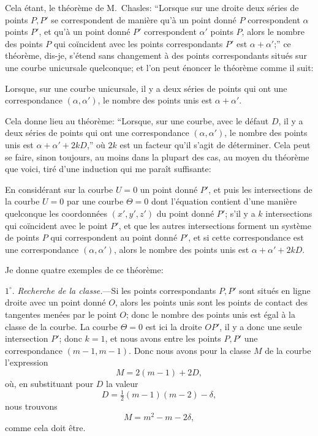 \documentclass[11pt]{article}
\begin{document}
Cela \'etant, le th\'eor\`eme de M.~Chasles: ``Lorsque sur une droite deux s\'eries de points $P, P'$ se correspondent de mani\`ere qu'\`a un point donn\'e $P$ correspondent $\alpha$ points $P'$, et qu'\`a un point donn\'e $P'$ correspondent $\alpha'$ points $P$, alors le nombre des points $P$ qui co\"incident avec les points correspondants $P'$ est $\alpha + \alpha'$;'' ce th\'eor\`eme, dis-je, s'\'etend sans changement \`a des points correspondants situ\'es sur une courbe unicursale quelconque; et l'on peut \'enoncer le th\'eor\`eme comme il suit:

Lorsque, sur une courbe unicursale, il y a deux s\'eries de points qui ont une correspondance $(\alpha, \alpha')$, le nombre des points unis est $\alpha + \alpha'$.

Cela donne lieu au th\'eor\`eme: ``Lorsque, sur une courbe, avec le d\'efaut $D$, il y a deux s\'eries de points qui ont une correspondance $(\alpha, \alpha')$, le nombre des points unis est $\alpha + \alpha' + 2kD$,'' o\`u $2k$ est un facteur qu'il s'agit de d\'eterminer. Cela peut se faire, sinon toujours, au moins dans la plupart des cas, au moyen du th\'eor\`eme que voici, tir\'e d'une induction qui me para\^it suffisante:

En consid\'erant sur la courbe $U = 0$ un point donn\'e $P'$, et puis les intersections de la courbe $U = 0$ par une courbe $\Theta = 0$ dont l'\'equation contient d'une mani\`ere quelconque les coordonn\'ees $(x', y', z')$ du point donn\'e $P'$; s'il y a $k$ intersections qui co\"incident avec le point $P'$, et que les autres intersections forment un syst\`eme de points $P$ qui correspondent au point donn\'e $P'$, et si cette correspondance est une correspondance $(\alpha, \alpha')$, alors le nombre des points unis est $\alpha + \alpha' + 2kD$.

Je donne quatre exemples de ce th\'eor\`eme:

$1^\circ$. \emph{Recherche de la classe.}---Si les points correspondants $P, P'$ sont situ\'es en ligne droite avec un point donn\'e $O$, alors les points unis sont les points de contact des tangentes men\'ees par le point $O$; donc le nombre des points unis est \'egal \`a la classe de la courbe. La courbe $\Theta = 0$ est ici la droite $OP'$, il y a donc une seule intersection $P'$; donc $k = 1$, et nous avons entre les points $P, P'$ une correspondance $(m - 1, m - 1)$. Donc nous avons pour la classe $M$ de la courbe l'expression
\[ M = 2(m - 1) + 2D, \]
o\`u, en substituant pour $D$ la valeur
\[ D = \tfrac{1}{2}(m - 1)(m - 2) - \delta, \]
nous trouvons
\[ M = m^2 - m - 2\delta, \]
comme cela doit \^etre.
\end{document}
